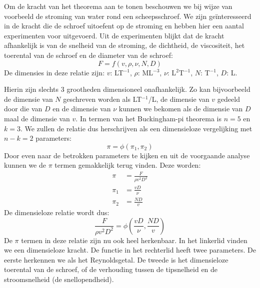 \begin{voorbeeld}
	Om de kracht van het theorema aan te tonen beschouwen we bij wijze van voorbeeld de stroming van water rond een scheepsschroef. We zijn geïnteresseerd in de kracht die de schroef uitoefent op de stroming en hebben hier een aantal experimenten voor uitgevoerd. Uit de experimenten blijkt dat de kracht afhankelijk is van de snelheid van de stroming, de dichtheid, de viscositeit, het toerental van de schroef en de diameter van de schroef:
	\begin{equation*}
		F = f(v,\rho,\nu,N,D)
		\label{eqn:dimensieanalyse, voorbeeld}
	\end{equation*}
	De dimensies in deze relatie zijn: $v$: LT$^{-1}$, $\rho$: ML$^{-3}$, $\nu$: L$^{2}$T$^{-1}$, $N$: T$^{-1}$, $D$: L.
	
	Hierin zijn slechts 3 grootheden dimensioneel onafhankelijk. Zo kan bijvoorbeeld de dimensie van $N$ geschreven worden als LT$^{-1}$/L, de dimensie van $v$ gedeeld door die van $D$ en de dimensie van $\nu$ kunnen we bekomen als de dimensie van $D$ maal de dimensie van $v$.  In termen van het Buckingham-pi theorema is $n=5$ en $k=3$. We zullen de relatie dus herschrijven als een dimensieloze vergelijking met $n-k=2$ parameters:
	\begin{equation}
		\pi = \phi(\pi_1,\pi_2)
	\end{equation}
	Door even naar de betrokken parameters te kijken en uit de voorgaande analyse kunnen we de $\pi$ termen gemakkelijk terug vinden. Deze worden:
	\begin{align*}
		\pi &= \frac{F}{\rho v^2 D^2} \\
		\pi_1 &= \frac{v D}{\nu} \\
		\pi_2 &= \frac{N D}{v}
	\end{align*}
	De dimensieloze relatie wordt dus:
	\begin{equation*}
		\frac{F}{\rho v^2 D^2} = \phi(\frac{v D}{\nu},\frac{N D}{v})
	\end{equation*}
	De $\pi$ termen in deze relatie zijn nu ook heel herkenbaar. In het linkerlid vinden we een dimensieloze kracht. De functie in het rechterlid heeft twee parameters. De eerste herkennen we als het Reynoldsgetal. De tweede is het dimensieloze toerental van de schroef, of de verhouding tussen de tipsnelheid en de stroomsnelheid (de snellopendheid).
	

\end{voorbeeld}
